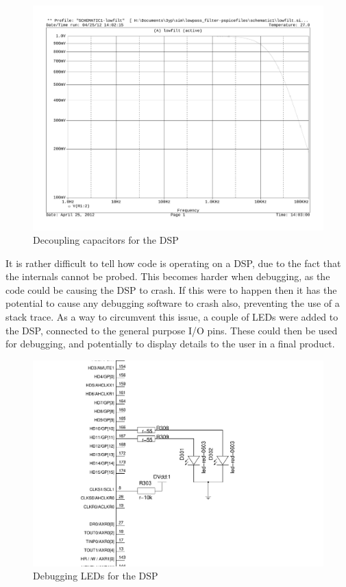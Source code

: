 \begin{figure}[H]
	\centering
	\includegraphics[width=\textwidth]{./img/signal_conditioning_sim.pdf}
	\caption{Decoupling capacitors for the DSP}
	\label{fig:dspdecouplingcaps}
\end{figure}

\noindent It is rather difficult to tell how code is operating on a DSP, due to the fact that the internals cannot be probed.
This becomes harder when debugging, as the code could be causing the DSP to crash.
If this were to happen then it has the potential to cause any debugging software to crash also, preventing the use of a stack trace.
As a way to circumvent this issue, a couple of LEDs were added to the DSP, connected to the general purpose I/O pins.
These could then be used for debugging, and potentially to display details to the user in a final product.

\begin{figure}[H]
	\centering
	\includegraphics[width=\textwidth]{./img/dsp_LEDs.pdf}
	\caption{Debugging LEDs for the DSP}
	\label{fig:dspdebugleds}
\end{figure}

